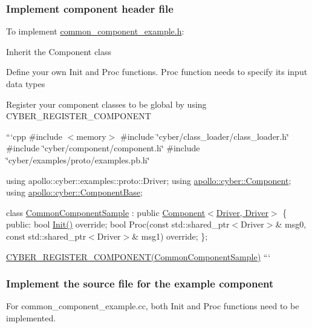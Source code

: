 \subsubsection*{Implement component header file}

To implement {\ttfamily \hyperlink{common__component__example_8h}{common\-\_\-component\-\_\-example.\-h}}\-:


\begin{DoxyItemize}
\item Inherit the Component class
\item Define your own {\ttfamily Init} and {\ttfamily Proc} functions. Proc function needs to specify its input data types
\item Register your component classes to be global by using {\ttfamily C\-Y\-B\-E\-R\-\_\-\-R\-E\-G\-I\-S\-T\-E\-R\-\_\-\-C\-O\-M\-P\-O\-N\-E\-N\-T}
\end{DoxyItemize}

```cpp \#include $<$memory$>$ \#include \char`\"{}cyber/class\-\_\-loader/class\-\_\-loader.\-h\char`\"{} \#include \char`\"{}cyber/component/component.\-h\char`\"{} \#include \char`\"{}cyber/examples/proto/examples.\-pb.\-h\char`\"{}

using apollo\-::cyber\-::examples\-::proto\-::\-Driver; using \hyperlink{classapollo_1_1cyber_1_1Component}{apollo\-::cyber\-::\-Component}; using \hyperlink{classapollo_1_1cyber_1_1ComponentBase}{apollo\-::cyber\-::\-Component\-Base};

class \hyperlink{classCommonComponentSample}{Common\-Component\-Sample} \-: public \hyperlink{classapollo_1_1cyber_1_1Component}{Component$<$\-Driver, Driver$>$} \{ public\-: bool \hyperlink{namespaceapollo_1_1cyber_a2d055a81b338116634deaf8ac3367aca}{Init()} override; bool Proc(const std\-::shared\-\_\-ptr$<$\-Driver$>$\& msg0, const std\-::shared\-\_\-ptr$<$\-Driver$>$\& msg1) override; \};

\hyperlink{component_8h_a031103527dc7f59a627459d635de10f8}{C\-Y\-B\-E\-R\-\_\-\-R\-E\-G\-I\-S\-T\-E\-R\-\_\-\-C\-O\-M\-P\-O\-N\-E\-N\-T(\-Common\-Component\-Sample)} ```

\subsubsection*{Implement the source file for the example component}

For {\ttfamily common\-\_\-component\-\_\-example.\-cc}, both {\ttfamily Init} and {\ttfamily Proc} functions need to be implemented.

